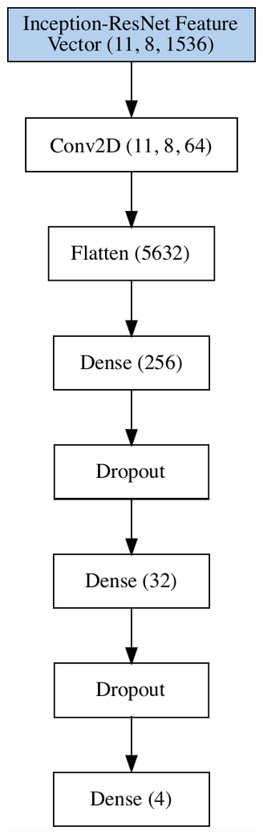 \begin{figure}[h!]
\begin{subfigure}[b]{0.3\linewidth}
  \end{subfigure}%
   \begin{subfigure}[b]{0.3\linewidth}
    \centering
    \includegraphics[scale=0.6]{graphics/image-classification-results/model/inception.pdf} 

\end{subfigure}
\end{figure}
